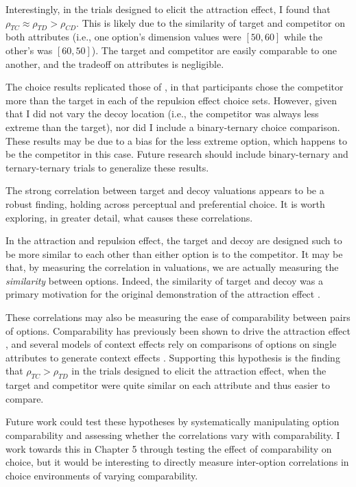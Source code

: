 Interestingly, in the trials designed to elicit the attraction effect, I found that $\rho_{TC}\approx\rho_{TD}>\rho_{CD}$. This is likely due to the similarity of target and competitor on both attributes (i.e., one option's dimension values were $[50,60]$ while the other's was $[60,50]$). The target and competitor are easily comparable to one another, and the tradeoff on attributes is negligible.

The choice results replicated those of \textcite{banerjeeFactorsThatPromote2024}, in that participants chose the competitor more than the target in each of the repulsion effect choice sets. However, given that I did not vary the decoy location (i.e., the competitor was always less extreme than the target), nor did I include a binary-ternary choice comparison. These results may be due to a bias for the less extreme option, which happens to be the competitor in this case. Future research should include binary-ternary and ternary-ternary trials to generalize these results.

The strong correlation between target and decoy valuations appears to be a robust finding, holding across perceptual and preferential choice. It is worth exploring, in greater detail, what causes these correlations. 

In the attraction and repulsion effect, the target and decoy are designed such to be more similar to each other than either option is to the competitor. It may be that, by measuring the correlation in valuations, we are actually measuring the \textit{similarity} between options. Indeed, the similarity of target and decoy was a primary motivation for the original demonstration of the attraction effect \parencite{huberAddingAsymmetricallyDominated1982d}. 

These correlations may also be measuring the ease of comparability between pairs of options. Comparability has previously been shown to drive the attraction effect \parencite{noguchi2014attraction,cataldoComparisonProcessAccount2019b}, and several models of context effects rely on comparisons of options on single attributes to generate context effects \parencite{trueblood2014multiattribute,roeMultialternativeDecisionField2001a}. Supporting this hypothesis is the finding that $\rho_{TC}>\rho_{TD}$ in the trials designed to elicit the attraction effect, when the target and competitor were quite similar on each attribute and thus easier to compare.

Future work could test these hypotheses by systematically manipulating option comparability and assessing whether the correlations vary with comparability. I work towards this in Chapter 5 through testing the effect of comparability on choice, but it would be interesting to directly measure inter-option correlations in choice environments of varying comparability. 
